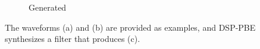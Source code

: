 \begin{figure}
\begin{subfigure}{.32\linewidth}
  \caption{Generated}
  \label{fig:synthEx}
\end{subfigure}
\caption{The waveforms (a) and (b) are provided as examples, and DSP-PBE synthesizes a filter that produces (c).}
\label{fig:test}
\end{figure}

